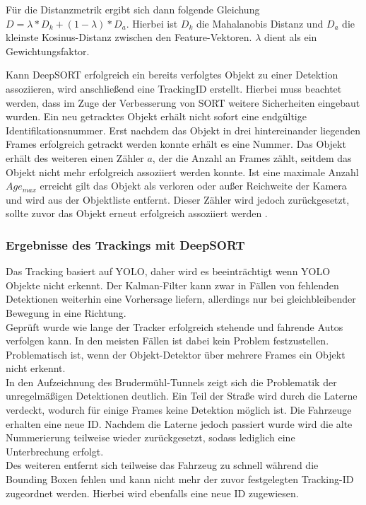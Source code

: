 \documentclass[conference]{IEEEtran}
\begin{document}
	Für die Distanzmetrik ergibt sich dann folgende Gleichung
	$D = \lambda * D_k + (1-\lambda) * D_a$. Hierbei ist $D_k$ die Mahalanobis Distanz und $D_a$ die kleinste Kosinus-Distanz zwischen den Feature-Vektoren. $\lambda$ dient als ein Gewichtungsfaktor.
	
	Kann DeepSORT erfolgreich ein bereits verfolgtes Objekt zu einer Detektion assoziieren, wird anschließend eine TrackingID erstellt. Hierbei muss beachtet werden, dass im Zuge der Verbesserung von SORT weitere Sicherheiten eingebaut wurden. Ein neu getracktes Objekt erhält nicht sofort eine endgültige Identifikationsnummer. Erst nachdem das Objekt in drei hintereinander liegenden Frames erfolgreich getrackt werden konnte erhält es eine Nummer. Das Objekt erhält des weiteren einen Zähler $a$, der die Anzahl an Frames zählt, seitdem das Objekt nicht mehr erfolgreich assoziiert werden konnte. Ist eine maximale Anzahl $Age_{max}$ erreicht gilt das Objekt als verloren oder außer Reichweite der Kamera und wird aus der Objektliste entfernt. Dieser Zähler wird jedoch zurückgesetzt, sollte zuvor das Objekt erneut erfolgreich assoziiert werden \cite{deepSort}.
	
	\subsubsection{Ergebnisse des Trackings mit DeepSORT}
	Das Tracking basiert auf YOLO, daher wird es beeinträchtigt wenn YOLO Objekte nicht erkennt. Der Kalman-Filter kann zwar in Fällen von fehlenden Detektionen weiterhin eine Vorhersage liefern, allerdings nur bei gleichbleibender Bewegung in eine Richtung.\\
	Geprüft wurde wie lange der Tracker erfolgreich stehende und fahrende Autos verfolgen kann. In den meisten Fällen ist dabei kein Problem festzustellen. Problematisch ist, wenn der Objekt-Detektor über mehrere Frames ein Objekt nicht erkennt.\\
	In den Aufzeichnung des Brudermühl-Tunnels zeigt sich die Problematik der
	unregelmäßigen Detektionen deutlich. Ein Teil der Straße wird durch die Laterne
	verdeckt, wodurch für einige Frames keine Detektion möglich ist. Die Fahrzeuge
	erhalten eine neue ID. Nachdem die Laterne jedoch passiert wurde wird die alte
	Nummerierung teilweise wieder zurückgesetzt, sodass lediglich eine Unterbrechung
	erfolgt.\\
	Des weiteren entfernt sich teilweise das Fahrzeug zu schnell während die Bounding Boxen fehlen und kann nicht
	mehr der zuvor festgelegten Tracking-ID zugeordnet werden. Hierbei wird ebenfalls eine neue ID zugewiesen.
	
\end{document}
